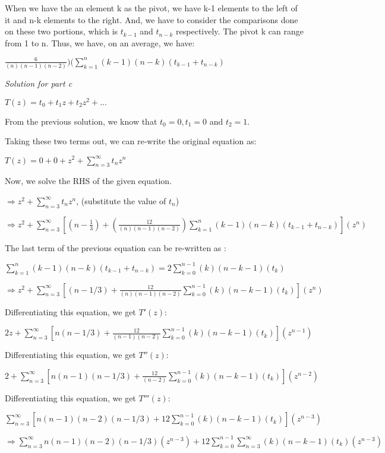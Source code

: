 \documentclass[11pt]{article}
\begin{document}
When we have the an element k as the pivot, we have k-1 elements to the left of it and n-k elements to the right. And, we have to consider the comparisons done on these two portions, which is $t_{k-1}$ and $t_{n-k}$ respectively. The pivot k can range from 1 to n. Thus, we have, on an average, we have: 

$\frac{6}{(n)(n-1)(n-2)})(\sum_{k=1}^{n} {(k-1)(n-k)(t_{k-1}+t_{n-k})}$

\medskip
\medskip

\textit{Solution for part c}

$T(z) = t_0 + t_1z+t_2z^2+...$

From the previous solution, we know that $t_0 = 0, t_1 = 0$ and $t_2=1$.

Taking these two terms out, we can re-write the original equation as:

$T(z) = 0 + 0 + z^2 + \sum_{n=3}^{\infty} t_nz^n$

Now, we solve the RHS of the given equation.

$\Longrightarrow z^2 + \sum_{n=3}^{\infty} t_nz^n$, (substitute the value of $t_n$) 

$\Longrightarrow z^2 + \sum_{n=3}^{\infty} [(n-\frac{1}{3})+(\frac{12}{(n)(n-1)(n-2)})\sum_{k=1}^{n} {(k-1)(n-k)(t_{k-1}+t_{n-k})}](z^n)$

The last term of the previous equation can be re-written as :

$\sum_{k=1}^{n} {(k-1)(n-k)(t_{k-1}+t_{n-k})} = 2\sum_{k=0}^{n-1} {(k)(n-k-1)(t_k)}$

$\Longrightarrow z^2 + \sum_{n=3}^{\infty} [(n-1/3) + \frac{12}{(n)(n-1)(n-2)}\sum_{k=0}^{n-1} {(k)(n-k-1)(t_k)}](z^n)$

Differentiating this equation, we get $T'(z)$:

$2z + \sum_{n=3}^{\infty} [n(n-1/3) + \frac{12}{(n-1)(n-2)}\sum_{k=0}^{n-1} {(k)(n-k-1)(t_k)}](z^{n-1})$ 

Differentiating this equation, we get $T''(z)$:

$2 + \sum_{n=3}^{\infty} [n(n-1)(n-1/3) + \frac{12}{(n-2)}\sum_{k=0}^{n-1} {(k)(n-k-1)(t_k)}](z^{n-2})$ 

Differentiating this equation, we get $T'''(z)$:

$\sum_{n=3}^{\infty} [n(n-1)(n-2)(n-1/3) + 12\sum_{k=0}^{n-1} {(k)(n-k-1)(t_k)}](z^{n-3})$

$\Longrightarrow \sum_{n=3}^{\infty} n(n-1)(n-2)(n-1/3)(z^{n-3}) + 12\sum_{k=0}^{n-1} \sum_{n=3}^{\infty}{(k)(n-k-1)(t_k)}(z^{n-3})$
\end{document}
